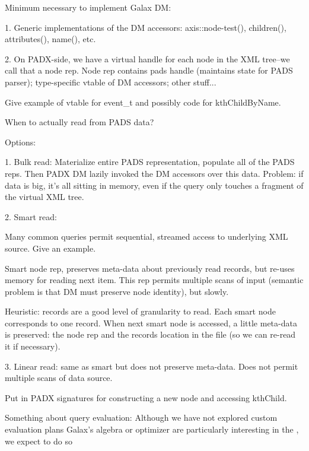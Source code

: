 Minimum necessary to implement Galax DM:

1. Generic implementations of the DM accessors: axis::node-test(), children(),
   attributes(), name(), etc. 

2. On PADX-side, we have a virtual handle for each node in the XML
   tree--we call that a node rep.  Node rep contains pads handle
   (maintains state for PADS parser); type-specific vtable of DM
   accessors; other stuff...

   Give example of vtable for event\_t and possibly code for
   kthChildByName. 

When to actually read from PADS data?

Options: 

1. Bulk read: Materialize entire PADS representation, populate all of the PADS
reps.  Then PADX DM lazily invoked the DM accessors over this data.
Problem: if data is big, it's all sitting in memory, even if the query
only touches a fragment of the virtual XML tree.

2. Smart read: 

Many common queries permit sequential, streamed access to underlying
XML source.  Give an example.  

Smart node rep, preserves meta-data about previously read records, but
re-uses memory for reading next item.  This rep permits multiple scans
of input (semantic problem is that DM must preserve node identity),
but slowly. 

Heuristic: records are a good level of granularity to read.   Each
smart node corresponds to one record.  When next smart node is
accessed, a little meta-data is preserved: the node rep and the
records location in the file (so we can re-read it if necessary).

3. Linear read: same as smart but does not preserve meta-data.
   Does not permit multiple scans of data source. 

Put in PADX signatures for constructing a new node and accessing
kthChild. 

Something about query evaluation:
Although we have not explored custom evaluation plans 
Galax's algebra or optimizer are particularly interesting in the 
\padx{}, we expect to do so 

